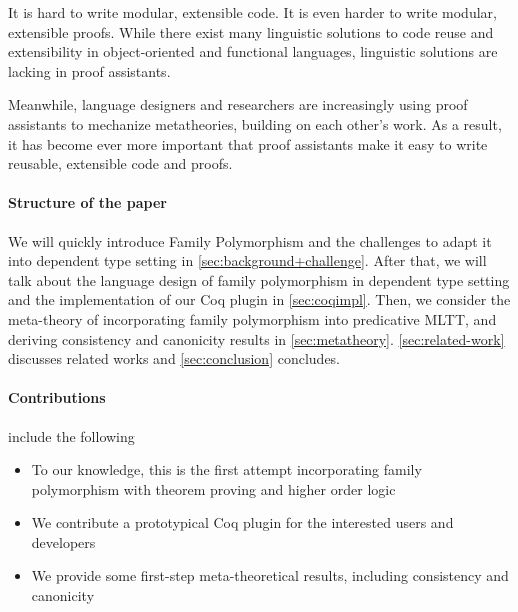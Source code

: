 It is hard to write modular, extensible code.
It is even harder to write modular, extensible proofs.
While there exist many linguistic solutions to code reuse and
extensibility in object-oriented and functional languages,
linguistic solutions are lacking in proof assistants.

Meanwhile, language designers and researchers are increasingly
using proof assistants to mechanize meta\-theories, building on each
other's work.
As a result, it has become ever more important that proof assistants
make it easy to write reusable, extensible code and proofs.



\paragraph{Structure of the paper} 
We will quickly introduce Family Polymorphism and the challenges to adapt it into dependent type setting in \cref{sec:background+challenge}. After that, we will talk about the language design of family polymorphism in dependent type setting and the implementation of our Coq plugin in \cref{sec:coqimpl}. Then, we consider the meta-theory of incorporating family polymorphism into predicative MLTT, and deriving consistency and canonicity results in \cref{sec:metatheory}. \ref{sec:related-work} discusses related works and \ref{sec:conclusion} concludes.


\paragraph{Contributions} include the following
\begin{itemize}
  \item To our knowledge, this is the first attempt incorporating family polymorphism with theorem proving and higher order logic
  \item We contribute a prototypical Coq plugin for the interested users and developers 
  \item We provide some first-step meta-theoretical results, including consistency and canonicity
\end{itemize}

